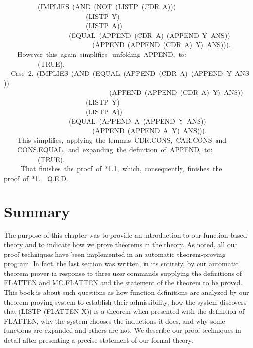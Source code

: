 \documentclass[11pt]{book}
\newenvironment{pubasis}{\begin{flushleft}\ttfamily\small}{\normalsize\rmfamily\end{flushleft}}
\newcommand{\pubdefaulttextsize}{\large}
\begin{document}
\begin{pubasis}
~~~~~~~~~~(IMPLIES~(AND~(NOT~(LISTP~(CDR~A)))\\
~~~~~~~~~~~~~~~~~~~~~~~~(LISTP~Y)\\
~~~~~~~~~~~~~~~~~~~~~~~~(LISTP~A))\\
~~~~~~~~~~~~~~~~~~~(EQUAL~(APPEND~(CDR~A)~(APPEND~Y~ANS))\\
~~~~~~~~~~~~~~~~~~~~~~~~~~(APPEND~(APPEND~(CDR~A)~Y)~ANS))).\\

~~~~However~this~again~simplifies,~unfolding~APPEND,~to:\\

~~~~~~~~~~(TRUE).\\

~~Case~2.~(IMPLIES~(AND~(EQUAL~(APPEND~(CDR~A)~(APPEND~Y~ANS))\\
~~~~~~~~~~~~~~~~~~~~~~~~~~~~~~~(APPEND~(APPEND~(CDR~A)~Y)~ANS))\\
~~~~~~~~~~~~~~~~~~~~~~~~(LISTP~Y)\\
~~~~~~~~~~~~~~~~~~~~~~~~(LISTP~A))\\
~~~~~~~~~~~~~~~~~~~(EQUAL~(APPEND~A~(APPEND~Y~ANS))\\
~~~~~~~~~~~~~~~~~~~~~~~~~~(APPEND~(APPEND~A~Y)~ANS))).\\

~~~~This~simplifies,~applying~the~lemmas~CDR.CONS,~CAR.CONS~and\\
~~~~CONS.EQUAL,~and~expanding~the~definition~of~APPEND,~to:\\

~~~~~~~~~~(TRUE).\\

~~~~~That~finishes~the~proof~of~*1.1,~which,~consequently,~finishes~the\\
proof~of~*1.~~Q.E.D.\\
\end{pubasis}
\section{Summary}
\pubdefaulttextsize
The purpose of this chapter was to provide an introduction to
our function-based theory and to indicate how we prove theorems in the theory.
As noted, all our proof techniques have
been implemented in an automatic theorem-proving program.
In fact, the last section was written, in its entirety,
by our automatic theorem prover in
response to three user commands supplying the definitions
of FLAT\-TEN and MC.FLAT\-TEN and the statement of the theorem to be
proved.
This book is about such questions as how function definitions are
analyzed by our theorem-proving system to establish their admissibility, how the system discovers that
(LISTP (FLATTEN X)) is a theorem when presented with the definition of
FLATTEN, why the system chooses the inductions it does, and why some
functions are expanded and others are not.  We describe our proof
techniques in detail after presenting a precise statement of our
formal theory.
\end{document}

